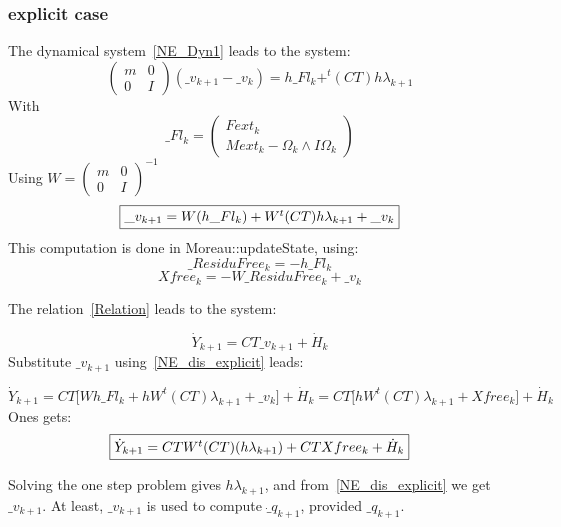\subsubsection{explicit case}
The dynamical system~\ref{NE_Dyn1} leads to the system:
\begin{equation}
  \left(\begin{array}{cc} m&0\\0&I\end{array}\right)
   (\_v_{k+1}-\_v_{k})=
   h \_Fl_k +
    ^t(CT) h\lambda _{k+1}
  \end{equation}
  With \[\_Fl_k = \left(\begin{array}{c} Fext_k\\ Mext_k - \Omega _k \wedge I\Omega _k \end{array}\right)\]
Using $W = \left(\begin{array}{cc} m&0\\0&I\end{array}\right) ^{-1} $
\begin{equation}
  \label{NE_dis_explicit}
  \fbox{$
   \_v_{k+1}=
   W (h \_Fl_k)+
   W ^t(CT)h\lambda _{k+1}+ \_v_k
   $}
  \end{equation}
  This computation is done in Moreau::updateState, using:
  \[\_ResiduFree_k = -h \_Fl_k\]
  \[Xfree_k = -W \_ResiduFree_k + \_v_k\]

The relation~\ref{Relation} leads to the system:

\[\dot Y _{k+1}= C T \_v_{k+1} + \dot H _{k} \]
Substitute $  \_v_{k+1} $ using~\ref{NE_dis_explicit} leads:

\[\dot Y _{k+1}= C T \lbrack W h\_Fl_k+
   hW^t(CT) \lambda _{k+1}+ \_v_k \rbrack
   + \dot H _{k} = C T \lbrack  hW ^t(CT) \lambda _{k+1}+ Xfree_k \rbrack
   + \dot H _{k}\]
Ones gets:
\[\fbox{$
\dot Y _{k+1}= C T W ^t(CT) (h\lambda _{k+1}) + CT Xfree_k +\dot H _{k} $}\]


Solving the one step problem gives $h\lambda _{k+1}$, and from~\ref{NE_dis_explicit} we get
$ \_v_{k+1} $. At least, $ \_v_{k+1} $ is used to compute $\dot \_q_{k+1}$, provided $\_q_{k+1}$.

